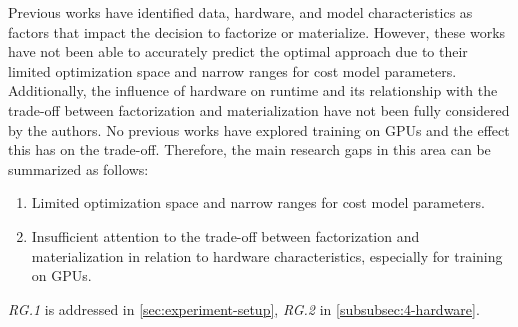 Previous works have identified data, hardware, and model characteristics as factors that impact the decision to factorize or materialize. However, these works have not been able to accurately predict the optimal approach due to their limited optimization space and narrow ranges for cost model parameters. Additionally, the influence of hardware on runtime and its relationship with the trade-off between factorization and materialization have not been fully considered by the authors. No previous works have explored training on GPUs and the effect this has on the trade-off. Therefore, the main research gaps in this area can be summarized as follows:
\begin{enumerate}[leftmargin=1.5cm, label=\emph{RG.\arabic*}]
    \item Limited optimization space and narrow ranges for cost model parameters.
    \item Insufficient attention to the trade-off between factorization and materialization in relation to hardware characteristics, especially for training on GPUs.
\end{enumerate}
\emph{RG.1} is addressed in \autoref{sec:experiment-setup}, \emph{RG.2} in \autoref{subsubsec:4-hardware}.